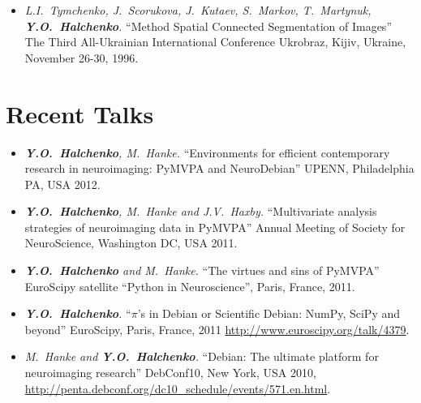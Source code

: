 \documentclass[12pt,overlapped,line]{res}
\newcommand{\mtitle}[1]{``#1''}
\newcommand{\mauthors}[1]{ \textit{#1.}}
\newcommand{\mwhere}[1]{#1.}
\begin{document}
\begin{resume}
\begin{itemize}
   \item
     \mauthors{L.I.~Tymchenko, J.~Scorukova, J.~Kutaev, S.~Markov, T.~Martynuk, \textbf{Y.O.~Halchenko}}
     \mtitle{Method Spatial Connected Segmentation of Images}
     \mwhere{The Third All-Ukrainian International Conference Ukrobraz, Kijiv, Ukraine, November 26-30, 1996}
 \end{itemize}

\section{Recent Talks}

 \begin{itemize}

 \item
   \mauthors{\textbf{Y.O.~Halchenko}, M.~Hanke}
   \mtitle{Environments for efficient contemporary research in neuroimaging: {PyMVPA} and {NeuroDebian}}
   \mwhere{UPENN, Philadelphia PA, USA 2012}

 \item
   \mauthors{\textbf{Y.O.~Halchenko}, M.~Hanke and J.V.~Haxby}
   \mtitle{Multivariate analysis strategies of neuroimaging data in PyMVPA}
   \mwhere{Annual Meeting of Society for NeuroScience, Washington DC,  USA 2011}

 \item
   \mauthors{\textbf{Y.O.~Halchenko} and M.~Hanke}
   \mtitle{The virtues and sins of PyMVPA}
   \mwhere{EuroScipy satellite ``Python in Neuroscience'', Paris, France, 2011}


 \item
   \mauthors{\textbf{Y.O.~Halchenko}}
   \mtitle{$\pi$'s in Debian or Scientific Debian: NumPy, SciPy and beyond}
   \mwhere{EuroScipy, Paris, France, 2011
     \url{http://www.euroscipy.org/talk/4379}}

 \item
   \mauthors{M.~Hanke and \textbf{Y.O.~Halchenko}}
   \mtitle{Debian: The ultimate platform for neuroimaging
     research}
   \mwhere{DebConf10, New York, USA 2010,
     \url{http://penta.debconf.org/dc10_schedule/events/571.en.html}}


%
%
%
%
 \end{itemize}


\end{resume}
\end{document}
